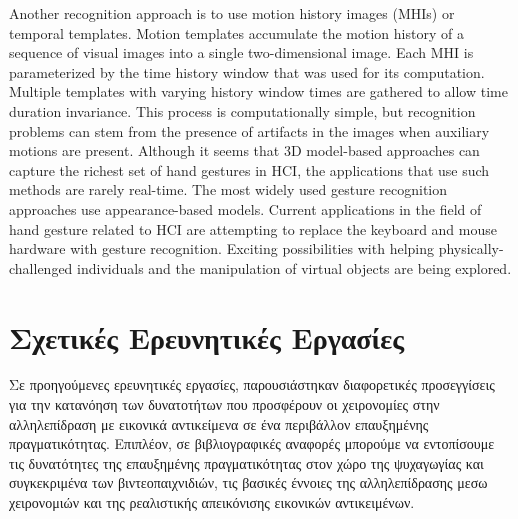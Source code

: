 Another recognition approach is to use motion history images (MHIs) or temporal templates. Motion templates accumulate the motion history of a sequence of visual images into a single two-dimensional image. Each MHI is parameterized by the time history window that was used for its computation. Multiple templates with varying history window times are gathered to allow time duration invariance. This process is computationally simple, but recognition problems can stem from the presence of artifacts in the images when auxiliary motions are present. Although it seems that 3D model-based approaches can capture the richest set of hand gestures in HCI, the applications that use such methods are rarely real-time. The most widely used gesture recognition approaches use appearance-based models. Current applications in the field of hand gesture related to HCI are attempting to replace the keyboard and mouse hardware with gesture recognition. Exciting possibilities with helping physically-challenged individuals and the manipulation of virtual objects are being explored.





\section{Σχετικές Ερευνητικές Εργασίες}
Σε προηγούμενες ερευνητικές εργασίες, παρουσιάστηκαν διαφορετικές προσεγγίσεις για την κατανόηση των δυνατοτήτων που προσφέρουν οι χειρονομίες στην αλληλεπίδραση με εικονικά αντικείμενα σε ένα περιβάλλον επαυξημένης πραγματικότητας. Επιπλέον, σε βιβλιογραφικές αναφορές μπορούμε να εντοπίσουμε τις δυνατότητες της επαυξημένης πραγματικότητας στον χώρο της ψυχαγωγίας και συγκεκριμένα των βιντεοπαιχνιδιών, τις βασικές έννοιες της αλληλεπίδρασης μεσω χειρονομιών και της ρεαλιστικής απεικόνισης εικονικών αντικειμένων.


